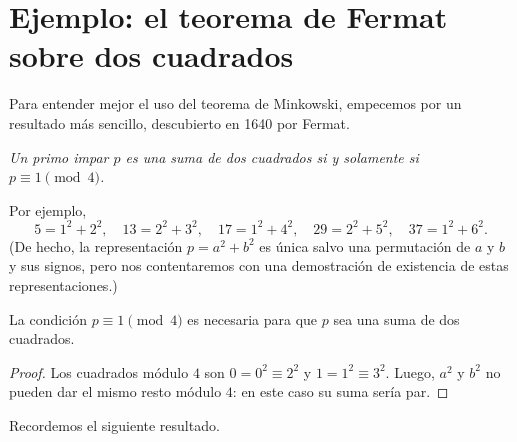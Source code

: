 \documentclass{article}
\numberwithin{equation}{section}
\begin{document}

\section{Ejemplo: el teorema de Fermat sobre dos cuadrados}

Para entender mejor el uso del teorema de Minkowski, empecemos por un resultado
más sencillo, descubierto en 1640 por Fermat.

\vspace{1em}

\emph{Un primo impar $p$ es una suma de dos cuadrados si y solamente si
  $p\equiv 1 \pmod{4}$.}

\vspace{1em}

Por ejemplo,
$$5 = 1^2 + 2^2, \quad 13 = 2^2 + 3^2, \quad 17 = 1^2 + 4^2, \quad 29 = 2^2 + 5^2, \quad 37 = 1^2 + 6^2.$$
(De hecho, la representación $p = a^2 + b^2$ es única salvo una permutación de
$a$ y $b$ y sus signos, pero nos contentaremos con una demostración de
existencia de estas representaciones.)

\begin{observacion}
  La condición $p \equiv 1 \pmod{4}$ es necesaria para que $p$ sea una suma de
  dos cuadrados.

  \begin{proof}
    Los cuadrados módulo $4$ son $0 = 0^2 \equiv 2^2$ y
    $1 = 1^2 \equiv 3^2$. Luego, $a^2$ y $b^2$ no pueden dar el mismo resto
    módulo $4$: en este caso su suma sería par.
  \end{proof}
\end{observacion}

Recordemos el siguiente resultado.
\end{document}
